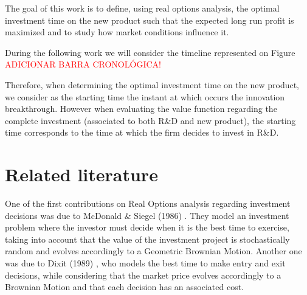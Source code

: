 The goal of this work is to define, using real
options analysis, the optimal investment time on the new product such that the expected long run profit is maximized and to study how market conditions influence it.

During the following work we will consider the timeline represented on Figure %
\textcolor{red}{ADICIONAR BARRA CRONOLÓGICA!}

Therefore, when determining the optimal investment time on the new product, we consider as the starting time the instant at which occurs the innovation breakthrough. However when evaluating the value function regarding the complete investment (associated to both R\&D and new product), the starting time corresponds to the time at which the firm decides to invest in R\&D.






\section{Related literature}


One of the first contributions on Real Options analysis regarding investment decisions was due to McDonald \& Siegel (1986)  \cite{siegel}. They model an investment problem where the investor must decide when it is the best time to exercise, taking into account that the value of the investment project is stochastically random and evolves accordingly to a Geometric Brownian Motion. Another one was due to Dixit (1989) \cite{dixit_alone}, who models the best time to make entry and exit decisions, while considering that the market price evolves accordingly to a Brownian Motion and that each decision has an associated cost.

